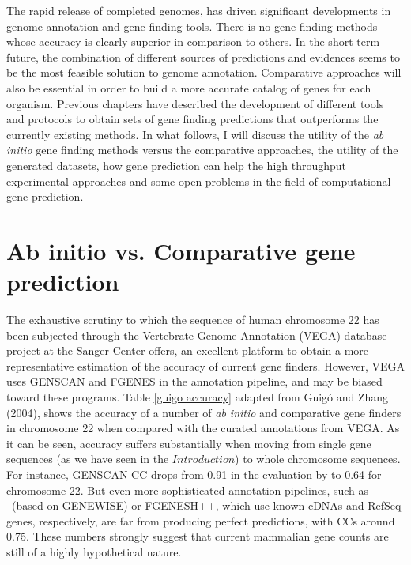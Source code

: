 The rapid release of completed genomes, has driven significant
developments in genome annotation and gene finding tools. There is no
gene finding methods whose accuracy is clearly superior in comparison
to others. In the short term future, the combination of different
sources of predictions and evidences seems to be the most feasible
solution to genome annotation. Comparative approaches will also be
essential in order to build a more accurate catalog of genes for each
organism. Previous chapters have described the development of
different tools and protocols to obtain sets of gene finding
predictions that outperforms the currently existing methods.  In what
follows, I will discuss the utility of the \textit{ab initio} gene
finding methods versus the comparative approaches, the utility of the
generated datasets, how gene prediction can help the high throughput
experimental approaches and some open problems in the field of
computational gene prediction.

\section{Ab initio vs. Comparative gene prediction}

The exhaustive scrutiny to which the sequence of human chromosome 22
\citep{dunham:1999a} has been subjected through the Vertebrate Genome
Annotation (VEGA) database project at the Sanger Center offers, an
excellent platform to obtain a more representative estimation of the
accuracy of current gene finders. However, VEGA uses GENSCAN and
FGENES in the annotation pipeline, and may be biased toward these
programs. Table \ref{guigo accuracy} adapted from Guig\'o and Zhang
(2004), shows the accuracy of a number of \textit{ab initio} and
comparative gene finders in chromosome 22 when compared with the
curated annotations from VEGA.  As it can be seen, accuracy suffers
substantially when moving from single gene sequences (as we have seen
in the $Introduction$) to whole chromosome sequences. For instance,
GENSCAN CC drops from 0.91 in the evaluation by \cite{rogic:2001a} to
0.64 for chromosome 22. But even more sophisticated annotation
pipelines, such as \ensembl\ (based on GENEWISE) or FGENESH++, which use
known cDNAs and RefSeq genes, respectively, are far from producing
perfect predictions, with CCs around 0.75. These numbers strongly
suggest that current mammalian gene counts are still of a highly
hypothetical nature.



